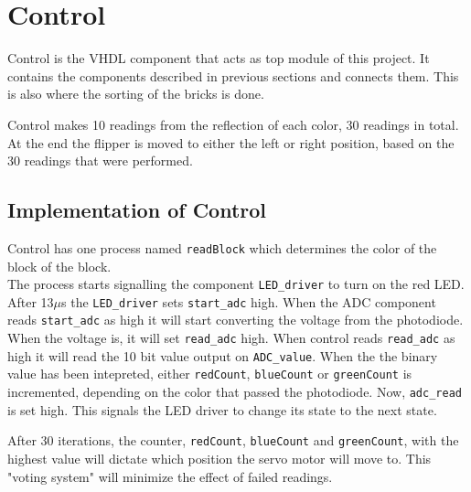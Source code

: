 \section{Control}
\label{sec:control}
Control is the VHDL component that acts as top module of this project. 
It contains the components described in previous sections and connects them.
This is also where the sorting of the bricks is done.

Control makes 10 readings from the reflection of each color, 30 readings in total. 
At the end the flipper is moved to either the left or right position, based on the 30 readings that were performed.

\subsection{Implementation of Control}


Control has  one process named \texttt{readBlock} which determines the color of the block of the block. \\


The process starts signalling the component \texttt{LED\_driver} to turn on the red LED. 
After 13$\mu$s the \texttt{LED\_driver} sets \texttt{start\_adc} high. 
When the ADC component reads \texttt{start\_adc} as high it will start converting the voltage from the photodiode.  
When the voltage is, it will set \texttt{read\_adc} high. 
When control reads \texttt{read\_adc} as high it will read the 10 bit value output on \texttt{ADC\_value}. When the the binary value has been intepreted, either \texttt{redCount}, \texttt{blueCount} or \texttt{greenCount} is incremented, depending on the color that passed the photodiode.
Now, \texttt{adc\_read} is set high. This signals the LED driver to change its state to the next state.

After 30 iterations, the counter, \texttt{redCount}, \texttt{blueCount} and \texttt{greenCount}, with the highest value will dictate which position the servo motor will move to.
This "voting system" will minimize the effect of failed readings.

